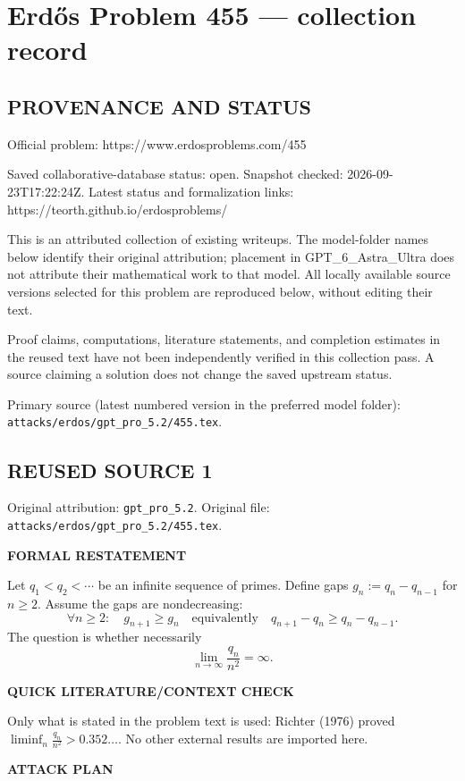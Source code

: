 \section*{Erd\H{o}s Problem 455 --- collection record}

\subsection*{PROVENANCE AND STATUS}
Official problem: https://www.erdosproblems.com/455

Saved collaborative-database status: open.
Snapshot checked: 2026-09-23T17:22:24Z.
Latest status and formalization links: https://teorth.github.io/erdosproblems/

This is an attributed collection of existing writeups. The model-folder names below identify their original attribution; placement in GPT\_6\_Astra\_Ultra does not attribute their mathematical work to that model. All locally available source versions selected for this problem are reproduced below, without editing their text.

Proof claims, computations, literature statements, and completion estimates in the reused text have not been independently verified in this collection pass. A source claiming a solution does not change the saved upstream status.

Primary source (latest numbered version in the preferred model folder): \texttt{attacks/erdos/gpt\_pro\_5.2/455.tex}.

\subsection*{REUSED SOURCE 1}
Original attribution: \texttt{gpt\_pro\_5.2}.
Original file: \texttt{attacks/erdos/gpt\_pro\_5.2/455.tex}.


\textbf{FORMAL RESTATEMENT}

Let $q_1<q_2<\cdots$ be an infinite sequence of primes. Define gaps $g_n:=q_n-q_{n-1}$ for $n\ge 2$.
Assume the gaps are nondecreasing:
\[
\forall n\ge 2:\quad g_{n+1}\ge g_n\quad\text{equivalently}\quad q_{n+1}-q_n\ge q_n-q_{n-1}.
\]
The question is whether necessarily
\[
\lim_{n\to\infty}\frac{q_n}{n^2}=\infty.
\]

\textbf{QUICK LITERATURE/CONTEXT CHECK}

Only what is stated in the problem text is used: Richter (1976) proved
$\liminf_n \frac{q_n}{n^2}>0.352\dots$.
No other external results are imported here.

\textbf{ATTACK PLAN}

